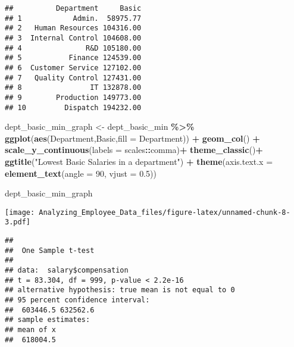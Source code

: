 \documentclass[
]{article}
\newenvironment{Shaded}{\begin{snugshade}}{\end{snugshade}}
\newcommand{\AttributeTok}[1]{\textcolor[rgb]{0.13,0.29,0.53}{#1}}
\newcommand{\DecValTok}[1]{\textcolor[rgb]{0.00,0.00,0.81}{#1}}
\newcommand{\FloatTok}[1]{\textcolor[rgb]{0.00,0.00,0.81}{#1}}
\newcommand{\FunctionTok}[1]{\textcolor[rgb]{0.13,0.29,0.53}{\textbf{#1}}}
\newcommand{\NormalTok}[1]{#1}
\newcommand{\OtherTok}[1]{\textcolor[rgb]{0.56,0.35,0.01}{#1}}
\newcommand{\SpecialCharTok}[1]{\textcolor[rgb]{0.81,0.36,0.00}{\textbf{#1}}}
\newcommand{\StringTok}[1]{\textcolor[rgb]{0.31,0.60,0.02}{#1}}
\begin{document}
\begin{verbatim}
##          Department     Basic
## 1            Admin.  58975.77
## 2   Human Resources 104316.00
## 3  Internal Control 104608.00
## 4               R&D 105180.00
## 5           Finance 124539.00
## 6  Customer Service 127102.00
## 7   Quality Control 127431.00
## 8                IT 132878.00
## 9        Production 149773.00
## 10         Dispatch 194232.00
\end{verbatim}

\begin{Shaded}
\begin{Highlighting}[]
\NormalTok{dept\_basic\_min\_graph }\OtherTok{\textless{}{-}}\NormalTok{ dept\_basic\_min }\SpecialCharTok{\%\textgreater{}\%} 
  \FunctionTok{ggplot}\NormalTok{(}\FunctionTok{aes}\NormalTok{(Department,Basic,}\AttributeTok{fill =}\NormalTok{ Department)) }\SpecialCharTok{+}
  \FunctionTok{geom\_col}\NormalTok{() }\SpecialCharTok{+}
  \FunctionTok{scale\_y\_continuous}\NormalTok{(}\AttributeTok{labels =}\NormalTok{ scales}\SpecialCharTok{::}\NormalTok{comma)}\SpecialCharTok{+} 
  \FunctionTok{theme\_classic}\NormalTok{()}\SpecialCharTok{+}  
  \FunctionTok{ggtitle}\NormalTok{(}\StringTok{"Lowest Basic Salaries in a department"}\NormalTok{) }\SpecialCharTok{+}
  \FunctionTok{theme}\NormalTok{(}\AttributeTok{axis.text.x =} \FunctionTok{element\_text}\NormalTok{(}\AttributeTok{angle =} \DecValTok{90}\NormalTok{, }\AttributeTok{vjust =} \FloatTok{0.5}\NormalTok{))}


\NormalTok{dept\_basic\_min\_graph}
\end{Highlighting}
\end{Shaded}

\texttt{[image: Analyzing\_Employee\_Data\_files/figure-latex/unnamed-chunk-8-3.pdf]}

\begin{Shaded}
\end{Shaded}

\begin{verbatim}
## 
##  One Sample t-test
## 
## data:  salary$compensation
## t = 83.304, df = 999, p-value < 2.2e-16
## alternative hypothesis: true mean is not equal to 0
## 95 percent confidence interval:
##  603446.5 632562.6
## sample estimates:
## mean of x 
##  618004.5
\end{verbatim}
\end{document}
